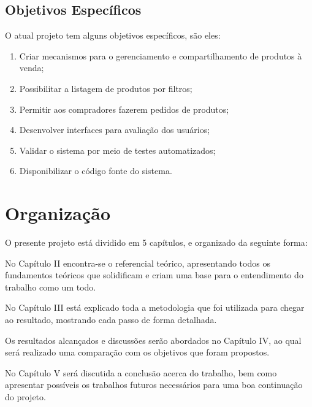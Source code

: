 \subsection{Objetivos Específicos}
O atual projeto tem alguns objetivos específicos, são eles:
\begin{enumerate}
    \item Criar mecanismos para o gerenciamento e compartilhamento de produtos à venda;
    \item Possibilitar a listagem de produtos por filtros;
    \item Permitir aos compradores fazerem pedidos de produtos;
    \item Desenvolver interfaces para avaliação dos usuários;
    \item Validar o sistema por meio de testes automatizados;
    \item Disponibilizar o código fonte do sistema.
\end{enumerate}


\section{Organização}
O presente projeto está dividido em 5 capítulos, e organizado da seguinte forma:

No Capítulo II encontra-se o referencial teórico, apresentando todos os fundamentos teóricos que solidificam e criam uma base para o entendimento do trabalho como um todo.

No Capítulo III está explicado toda a metodologia que foi utilizada para chegar ao resultado, mostrando cada passo de forma detalhada.

Os resultados alcançados e discussões serão abordados no Capítulo IV, ao qual será realizado uma comparação com os objetivos que foram propostos.

No Capítulo V será discutida a conclusão acerca do trabalho, bem como apresentar possíveis os trabalhos futuros necessários para uma boa continuação do projeto.